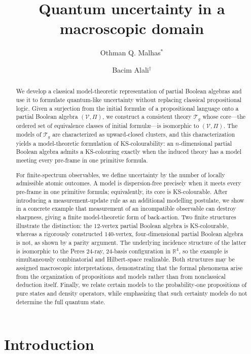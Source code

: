 \documentclass{article}   	%
\title{Quantum uncertainty in a macroscopic domain}
\author{Othman Q. Malhas$^*$
\and
Bacim Alali$^\dag$}
\date{}
\theoremstyle{plain}
\theoremstyle{definition}
\theoremstyle{remark}
\begin{document}
\maketitle

\begin{abstract}
We develop a classical model-theoretic representation of partial Boolean algebras and use it to formulate quantum-like uncertainty without replacing classical propositional logic.  Given a surjection from the initial formul\ae\ of a propositional language onto a partial Boolean algebra $(\mathcal V,\Pi)$, we construct a consistent theory $\mathcal T_g$ whose core---the ordered set of equivalence classes of initial formul\ae---is isomorphic to $(\mathcal V,\Pi)$.  The models of $\mathcal T_g$ are characterized as upward-closed clusters, and this characterization yields a model-theoretic formulation of KS-colourability: an $n$-dimensional partial Boolean algebra admits a KS-colouring exactly when the induced theory has a model meeting every pre-frame in one primitive formula.

For finite-spectrum observables, we define uncertainty by the number of locally admissible atomic outcomes.  A model is dispersion-free precisely when it meets every pre-frame in one primitive formula; equivalently, its core is KS-colourable.  After introducing a measurement-update rule as an additional modelling postulate, we show in a concrete example that measurement of an incompatible observable can destroy sharpness, giving a finite model-theoretic form of back-action.  Two finite structures illustrate the distinction: the $12$-vertex partial Boolean algebra is KS-colourable, whereas a rigorously constructed $140$-vertex, four-dimensional partial Boolean algebra is not, as shown by a parity argument.  The underlying incidence structure of the latter is isomorphic to the Peres $24$-ray, $24$-basis configuration in $\mathbb R^4$, so the example is simultaneously combinatorial and Hilbert-space realizable.  Both structures may be assigned macroscopic interpretations, demonstrating that the formal phenomena arise from the organization of propositions and models rather than from nonclassical deduction itself.  Finally, we relate certain models to the probability-one propositions of pure states and density operators, while emphasizing that such certainty models do not determine the full quantum state.
\end{abstract}

\section{Introduction}
\end{document}
